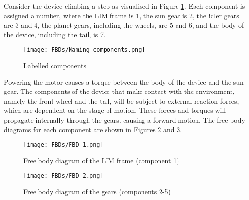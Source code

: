 Consider the device climbing a step as visualised in Figure \ref{Component-names}. Each component is assigned a number, where the LIM frame is 1, the sun gear is 2, the idler gears are 3 and 4, the planet gears, including the wheels, are 5 and 6, and the body of the device, including the tail, is 7.
\begin{figure}[h]
	\centering
	\texttt{[image: FBDs/Naming components.png]}
	\caption{Labelled components}
	\label{Component-names}
\end{figure}
Powering the motor causes a torque between the body of the device and the sun gear. The components of the device that make contact with the environment, namely the front wheel and the tail, will be subject to external reaction forces, which are dependent on the stage of motion. These forces and torques will propagate internally through the gears, causing a forward motion. The free body diagrams for each component are shown in Figures \ref{FBD-1} and \ref{FBD-2}.\\
\begin{figure}[h]
	\centering
	\texttt{[image: FBDs/FBD-1.png]}
	\caption{Free body diagram of the LIM frame (component 1)}
	\label{FBD-1}
\end{figure}
\begin{figure}[!h]
	\centering
	\texttt{[image: FBDs/FBD-2.png]}
	\caption{Free body diagram of the gears (components 2-5)}
	\label{FBD-2}
\end{figure}

